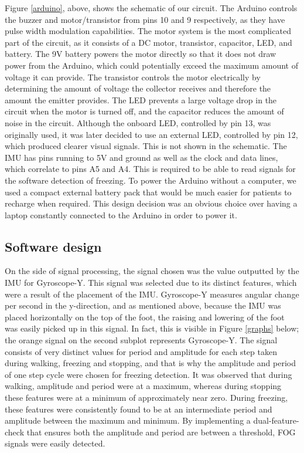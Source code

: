 \documentclass[titlepage]{article}
\begin{document}
\begin{doublespacing}
Figure \ref{arduino}, above, shows the schematic of our circuit. The Arduino controls the buzzer and motor/transistor from pins 10 and 9 respectively, as they have pulse width modulation capabilities. The motor system is the most complicated part of the circuit, as it consists of a DC motor, transistor, capacitor, LED, and battery. The 9V battery powers the motor directly so that it does not draw power from the Arduino, which could potentially exceed the maximum amount of voltage it can provide. The transistor controls the motor electrically by determining the amount of voltage the collector receives and therefore the amount the emitter provides. The LED prevents a large voltage drop in the circuit when the motor is turned off, and the capacitor reduces the amount of noise in the circuit. Although the onboard LED, controlled by pin 13, was originally used, it was later decided to use an external LED, controlled by pin 12, which produced clearer visual signals. This is not shown in the schematic. The IMU has pins running to 5V and ground as well as the clock and data lines, which correlate to pins A5 and A4. This is required to be able to read signals for the software detection of freezing. To power the Arduino without a computer, we used a compact external battery pack that would be much easier for patients to recharge when required. This design decision was an obvious choice over having a laptop constantly connected to the Arduino in order to power it.

\subsection{Software design}

On the side of signal processing, the signal chosen was the value outputted by the IMU for Gyroscope-Y. This signal was selected due to its distinct features, which were a result of the placement of the IMU. Gyroscope-Y measures angular change per second in the y-direction, and as mentioned above, because the IMU was placed horizontally on the top of the foot, the raising and lowering of the foot was easily picked up in this signal. In fact, this is visible in Figure \ref{graphs} below; the orange signal on the second subplot represents Gyroscope-Y. The signal consists of very distinct values for period and amplitude for each step taken during walking, freezing and stopping, and that is why the amplitude and period of one step cycle were chosen for freezing detection. It was observed that during walking, amplitude and period were at a maximum, whereas during stopping these features were at a minimum of approximately near zero. During freezing, these features were consistently found to be at an intermediate period and amplitude between the maximum and minimum. By implementing a dual-feature-check that ensures both the amplitude and period are between a threshold, FOG signals were easily detected.


\end{doublespacing}
\end{document}
